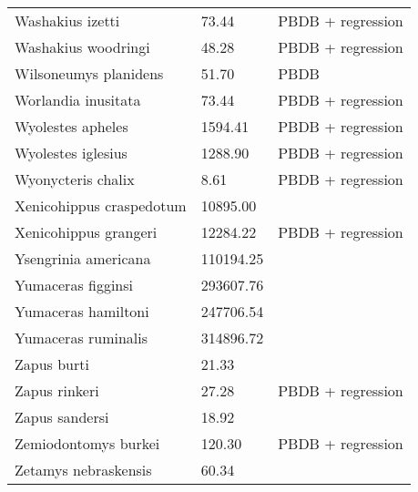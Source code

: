 \documentclass{article}
\begin{document}
\begin{center}
\begin{longtable}{p{} p{} p{} }
  Washakius izetti & 73.44 & PBDB + regression \\ 
  Washakius woodringi & 48.28 & PBDB + regression \\ 
  Wilsoneumys planidens & 51.70 & PBDB \\ 
  Worlandia inusitata & 73.44 & PBDB + regression \\ 
  Wyolestes apheles & 1594.41 & PBDB + regression \\ 
  Wyolestes iglesius & 1288.90 & PBDB + regression \\ 
  Wyonycteris chalix & 8.61 & PBDB + regression \\ 
  Xenicohippus craspedotum & 10895.00 & \cite{McKenna2011} \\ 
  Xenicohippus grangeri & 12284.22 & PBDB + regression \\ 
  Ysengrinia americana & 110194.25 & \cite{Tomiya2013} \\ 
  Yumaceras figginsi & 293607.76 & \cite{Tomiya2013} \\ 
  Yumaceras hamiltoni & 247706.54 & \cite{Tomiya2013} \\ 
  Yumaceras ruminalis & 314896.72 & \cite{Tomiya2013} \\ 
  Zapus burti & 21.33 & \cite{Tomiya2013} \\ 
  Zapus rinkeri & 27.28 & PBDB + regression \\ 
  Zapus sandersi & 18.92 & \cite{Tomiya2013} \\ 
  Zemiodontomys burkei & 120.30 & PBDB + regression \\ 
  Zetamys nebraskensis & 60.34 & \cite{Tomiya2013} \\ 
  \end{longtable}
\end{center}

\end{document}
